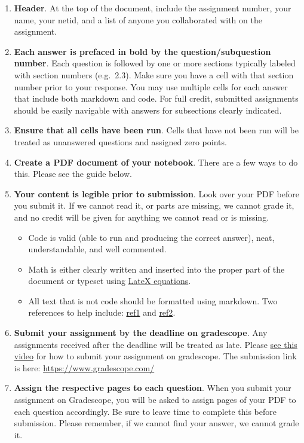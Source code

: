 \documentclass[
  letterpaper,
  DIV=11,
  numbers=noendperiod]{scrartcl}
\providecommand{\tightlist}{%
  \setlength{\itemsep}{0pt}\setlength{\parskip}{0pt}}\usepackage{longtable,booktabs,array}
\begin{document}
\begin{enumerate}
\def\labelenumi{\arabic{enumi}.}
\tightlist
\item
  \textbf{Header}. At the top of the document, include the assignment
  number, your name, your netid, and a list of anyone you collaborated
  with on the assignment.
\item
  \textbf{Each answer is prefaced in bold by the question/subquestion
  number}. Each question is followed by one or more sections typically
  labeled with section numbers (e.g.~2.3). Make sure you have a cell
  with that section number prior to your response. You may use multiple
  cells for each answer that include both markdown and code. For full
  credit, submitted assignments should be easily navigable with answers
  for subsections clearly indicated.
\item
  \textbf{Ensure that all cells have been run}. Cells that have not been
  run will be treated as unanswered questions and assigned zero points.
\item
  \textbf{Create a PDF document of your notebook}. There are a few ways
  to do this. Please see the guide below.
\item
  \textbf{Your content is legible prior to submission}. Look over your
  PDF before you submit it. If we cannot read it, or parts are missing,
  we cannot grade it, and no credit will be given for anything we cannot
  read or is missing.

  \begin{itemize}
  \tightlist
  \item
    Code is valid (able to run and producing the correct answer), neat,
    understandable, and well commented.
  \item
    Math is either clearly written and inserted into the proper part of
    the document or typeset using
    \href{https://tobi.oetiker.ch/lshort/lshort.pdf}{LateX equations}.
  \item
    All text that is not code should be formatted using markdown. Two
    references to help include:
    \href{https://github.com/adam-p/markdown-here/wiki/Markdown-Cheatsheet}{ref1}
    and
    \href{http://jupyter-notebook.readthedocs.io/en/stable/examples/Notebook/Working\%20With\%20Markdown\%20Cells.html}{ref2}.
  \end{itemize}
\item
  \textbf{Submit your assignment by the deadline on gradescope}. Any
  assignments received after the deadline will be treated as late.
  Please \href{https://www.youtube.com/watch?v=nksyA0s-Geo}{see this
  video} for how to submit your assignment on gradescope. The submission
  link is here: \url{https://www.gradescope.com/}
\item
  \textbf{Assign the respective pages to each question}. When you submit
  your assignment on Gradescope, you will be asked to assign pages of
  your PDF to each question accordingly. Be sure to leave time to
  complete this before submission. Please remember, if we cannot find
  your answer, we cannot grade it.
\end{enumerate}
\end{document}
